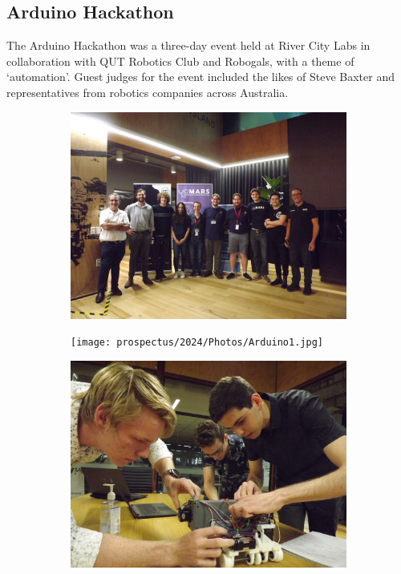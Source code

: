 \documentclass[a4paper,12pt]{report}
\begin{document}
\vspace{-1cm}

\subsection{Arduino Hackathon}
The Arduino Hackathon was a three-day event held at River City Labs in collaboration with QUT Robotics Club and Robogals, with a theme of ‘automation’. Guest judges for the event included the likes of Steve Baxter and representatives from robotics companies across Australia.   

\begin{figure}[H]
    \centering
    \begin{subfigure}{0.32\linewidth}
        \includegraphics[width=0.99\linewidth]{prospectus/2024/Photos/ArdHackCombined.JPG}
    \end{subfigure}
    \begin{subfigure}{0.32\linewidth}
        \texttt{[image: prospectus/2024/Photos/Arduino1.jpg]}
    \end{subfigure}
    \begin{subfigure}{0.32\linewidth}
        \includegraphics[width=0.99\linewidth]{prospectus/2024/Photos/winnerWinner.JPG}
    \end{subfigure}
\end{figure}
\end{document}
